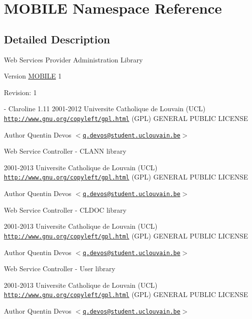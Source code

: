 \hypertarget{namespace_m_o_b_i_l_e}{
\section{MOBILE Namespace Reference}
\label{namespace_m_o_b_i_l_e}
}


\subsection{Detailed Description}
Web Services Provider Administration Library

\begin{DoxyVersion}{Version}
\hyperlink{namespace_m_o_b_i_l_e}{MOBILE} 1 
\end{DoxyVersion}
\begin{DoxyParagraph}{Revision:}
1 
\end{DoxyParagraph}
-\/ Claroline 1.11  2001-\/2012 Universite Catholique de Louvain (UCL)  \href{http://www.gnu.org/copyleft/gpl.html}{\tt http://www.gnu.org/copyleft/gpl.html} (GPL) GENERAL PUBLIC LICENSE

\begin{DoxyAuthor}{Author}
Quentin Devos $<$\href{mailto:q.devos@student.uclouvain.be}{\tt q.devos@student.uclouvain.be}$>$
\end{DoxyAuthor}
Web Service Controller -\/ CLANN library

2001-\/2013 Universite Catholique de Louvain (UCL)  \href{http://www.gnu.org/copyleft/gpl.html}{\tt http://www.gnu.org/copyleft/gpl.html} (GPL) GENERAL PUBLIC LICENSE

\begin{DoxyAuthor}{Author}
Quentin Devos $<$\href{mailto:q.devos@student.uclouvain.be}{\tt q.devos@student.uclouvain.be}$>$
\end{DoxyAuthor}
Web Service Controller -\/ CLDOC library

2001-\/2013 Universite Catholique de Louvain (UCL)  \href{http://www.gnu.org/copyleft/gpl.html}{\tt http://www.gnu.org/copyleft/gpl.html} (GPL) GENERAL PUBLIC LICENSE

\begin{DoxyAuthor}{Author}
Quentin Devos $<$\href{mailto:q.devos@student.uclouvain.be}{\tt q.devos@student.uclouvain.be}$>$
\end{DoxyAuthor}
Web Service Controller -\/ User library

2001-\/2013 Universite Catholique de Louvain (UCL)  \href{http://www.gnu.org/copyleft/gpl.html}{\tt http://www.gnu.org/copyleft/gpl.html} (GPL) GENERAL PUBLIC LICENSE

\begin{DoxyAuthor}{Author}
Quentin Devos $<$\href{mailto:q.devos@student.uclouvain.be}{\tt q.devos@student.uclouvain.be}$>$ 
\end{DoxyAuthor}
